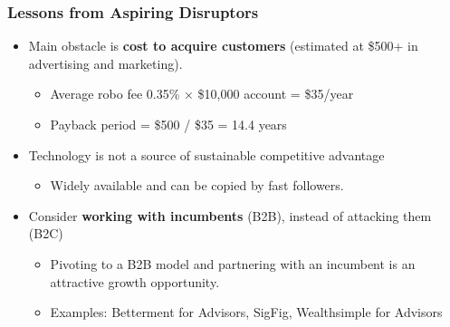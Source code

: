 \documentclass[aspectratio=169]{beamer}
\begin{document}
\begin{frame}
\frametitle{Lessons from Aspiring Disruptors}


\vspace{-2mm}
\begin{itemize}
    \item Main obstacle is \textbf{cost to acquire customers} (estimated at \$500+ in advertising and marketing).
    \begin{itemize}
        \item Average robo fee 0.35\% × \$10,000 account = \$35/year
        \item Payback period = \$500 / \$35 = 14.4 years
    \end{itemize}

    \item Technology is not a source of sustainable competitive advantage
    \begin{itemize}
        \item Widely available and can be copied by fast followers.
    \end{itemize}

    \item Consider \textbf{working with incumbents} (B2B), instead of attacking them (B2C)
    \begin{itemize}
        \item Pivoting to a B2B model and partnering with an incumbent is an attractive growth opportunity.
        
        \item Examples: Betterment for Advisors, SigFig, Wealthsimple for Advisors
        
    \end{itemize}
\end{itemize}


\end{frame} 
\end{document}
